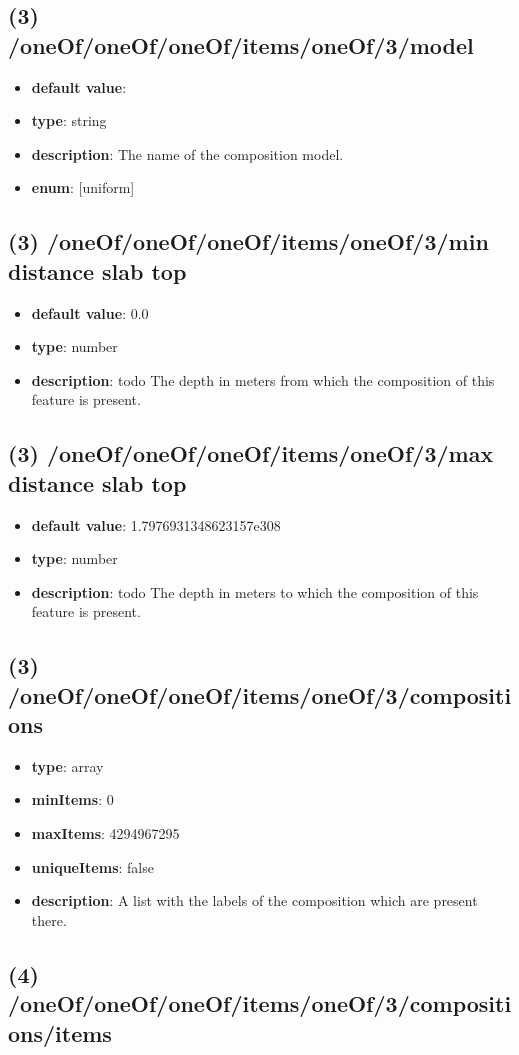\subsection{(3) /oneOf/oneOf/oneOf/items/oneOf/3/model}
\begin{itemize}[leftmargin=3em]\item {\bf default value}: 
\item {\bf type}: string
\item {\bf description}: The name of the composition model.
\item {\bf enum}: [uniform]\end{itemize}\subsection{(3) /oneOf/oneOf/oneOf/items/oneOf/3/min distance slab top}
\begin{itemize}[leftmargin=3em]\item {\bf default value}: 0.0
\item {\bf type}: number
\item {\bf description}: todo The depth in meters from which the composition of this feature is present.
\end{itemize}\subsection{(3) /oneOf/oneOf/oneOf/items/oneOf/3/max distance slab top}
\begin{itemize}[leftmargin=3em]\item {\bf default value}: 1.7976931348623157e308
\item {\bf type}: number
\item {\bf description}: todo The depth in meters to which the composition of this feature is present.
\end{itemize}\subsection{(3) /oneOf/oneOf/oneOf/items/oneOf/3/compositions}
\begin{itemize}[leftmargin=3em]\item {\bf type}: array
\item {\bf minItems}: 0
\item {\bf maxItems}: 4294967295
\item {\bf uniqueItems}: false
\item {\bf description}: A list with the labels of the composition which are present there.
\end{itemize}\subsection{(4) /oneOf/oneOf/oneOf/items/oneOf/3/compositions/items}
